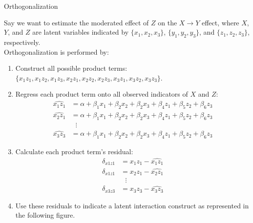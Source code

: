 \documentclass{beamer}
\newcommand{\va}[0]{\vspace{12pt}}
\newcommand{\vb}[0]{\vspace{6pt}}
\begin{document}
\begin{frame}[allowframebreaks]{Orthogonalization}
  
  Say we want to estimate the moderated effect of $Z$ on the $X
  \rightarrow Y$ effect, where $X$, $Y$, and $Z$ are latent variables
  indicated by $\{x_1, x_2, x_3\}$, $\{y_1, y_2, y_3\}$, and $\{z_1,
  z_2, z_3\}$, respectively.\\
  \va
  Orthogonalization is performed by:
  \vb
  \begin{enumerate}
  \item Construct all possible product terms: $\{x_1z_1, x_1z_2, x_1z_3, x_2z_1, x_2z_2, x_2z_3, x_3z_1, x_3z_2, x_3z_3\}$.
    \vb
  \item Regress each product term onto all observed indicators of $X$ and $Z$:
    \begin{align*}
      \widehat{x_1z_1} &= \alpha + \beta_1x_1 + \beta_2x_2 + \beta_2x_3 + 
      \beta_4z_1 + \beta_5z_2 + \beta_6z_3\\
      \widehat{x_2z_1} &= \alpha + \beta_1x_1 + \beta_2x_2 + \beta_2x_3 + 
      \beta_4z_1 + \beta_5z_2 + \beta_6z_3\\
      &~~~\vdots\\
      \widehat{x_3z_3} &= \alpha + \beta_1x_1 + \beta_2x_2 + \beta_2x_3 + 
      \beta_4z_1 + \beta_5z_2 + \beta_6z_3
    \end{align*}
    
    \pagebreak
    
  \item Calculate each product term's residual:
    \begin{align*}
      \delta_{x1z1} &= x_1z_1 - \widehat{x_1z_1}\\
      \delta_{x1z1} &= x_2z_1 - \widehat{x_2z_1}\\
      &~~~\vdots\\
      \delta_{x3z3} &= x_3z_3 - \widehat{x_3z_3}
    \end{align*}
    \vb
  \item Use these residuals to indicate a latent interaction construct
    as represented in the following figure.
  \end{enumerate}
  
\end{frame}
\end{document}
